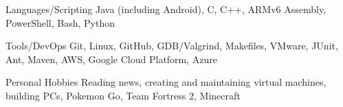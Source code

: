 

\begin{cvskills}


  \cvskill
    {Languages/Scripting} %
    {Java (including Android), C, C++, ARMv6 Assembly, PowerShell, Bash, Python} %
    
  \cvskill
    {Tools/DevOps} %
    {Git, Linux, GitHub, GDB/Valgrind, Makefiles, VMware, JUnit, Ant, Maven, AWS, Google Cloud Platform, Azure} %

  \cvskill
  {Personal Hobbies} %
  {Reading news, creating and maintaining virtual machines, building PCs, Pokemon Go, Team Fortress 2, Minecraft} %

\end{cvskills}
